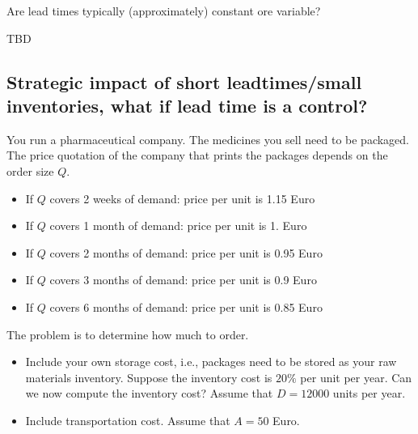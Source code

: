 \begin{question}
  Are lead times typically (approximately) constant ore variable?
  \begin{solution}
    TBD
  \end{solution}
\end{question}



\subsection{Strategic impact of short leadtimes/small inventories,
  what if lead time is a control?}

You run a pharmaceutical company. The medicines you sell need to be
packaged. The price quotation of the company that prints the packages
depends on the order size $Q$.
  \begin{itemize}
  \item If $Q$ covers 2 weeks of demand: price per unit is 1.15 Euro
  \item If $Q$ covers 1 month of demand: price per unit is 1. Euro
  \item If $Q$ covers 2 months of demand: price per unit is 0.95 Euro
  \item If $Q$ covers 3 months of demand: price per unit is 0.9 Euro
  \item If $Q$ covers 6 months of demand: price per unit is 0.85 Euro
  \end{itemize}
The problem is to determine how much to order.

\begin{question}
  \begin{itemize}
  \item Include your own storage cost, i.e., packages need to be
    stored as your raw materials inventory.  Suppose the
    inventory cost is $20\%$ per unit per year. Can we now compute the
    inventory cost?  Assume that $D = 12000$ units per year.
  \item Include transportation cost.  Assume that $A = 50$ Euro.
  \end{itemize}
\end{question}

